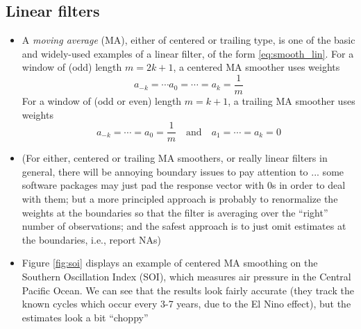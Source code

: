 \documentclass{article}
\begin{document}
\subsection{Linear filters}

\begin{itemize}
\item A \emph{moving average} (MA), either of centered or trailing type, is one
  of the basic and widely-used examples of a linear filter, of the form 
  \eqref{eq:smooth_lin}. For a window of (odd) length $m = 2k+1$, a centered MA
  smoother uses weights 
  \[
  a_{-k} = \cdots a_0 = \cdots = a_k = \frac{1}{m}
  \]
  For a window of (odd or even) length $m = k+1$, a trailing MA smoother uses
  weights 
  \[
  a_{-k} = \cdots = a_0 = \frac{1}{m} \quad \text{and} \quad 
  a_1 = \cdots = a_k = 0
  \]

\item (For either, centered or trailing MA smoothers, or really linear filters
  in general, there will be annoying boundary issues to pay attention to
  ... some software packages may just pad the response vector with 0s in order
  to deal with them; but a more principled approach is probably to renormalize
  the weights at the boundaries so that the filter is averaging over the
  ``right'' number of observations; and the safest approach is to just omit 
  estimates at the boundaries, i.e., report NAs)

\item Figure \ref{fig:soi} displays an example of centered MA smoothing on the 
  Southern Oscillation Index (SOI), which measures air pressure in the Central 
  Pacific Ocean. We can see that the results look fairly accurate (they track
  the known cycles which occur every 3-7 years, due to the El Nino effect), but
  the estimates look a bit ``choppy''    


\end{itemize}
\end{document}
